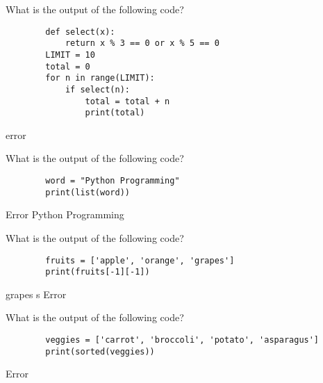 \documentclass{exam}
\begin{document}
\begin{questions}
   \question What is the output of the following code?

    \begin{verbatim}
        def select(x):
            return x % 3 == 0 or x % 5 == 0
        LIMIT = 10
        total = 0
        for n in range(LIMIT):
            if select(n):
                total = total + n
                print(total)
    \end{verbatim}
    \begin{oneparchoices}
        \choice error
    \end{oneparchoices}

   \question What is the output of the following code?

    \begin{verbatim}
        word = "Python Programming"
        print(list(word))
    \end{verbatim}
    \begin{oneparchoices}
        \choice Error
        \choice Python Programming
        \choice ['P', 'y', 't', 'h', 'o', 'n', ' ', 'P', 'r', 'o', 'g', 'r', 'a', 'm', 'm', 'i', 'n', 'g']
    \end{oneparchoices}

   \question What is the output of the following code?

    \begin{verbatim}
        fruits = ['apple', 'orange', 'grapes']
        print(fruits[-1][-1])
    \end{verbatim}
    \begin{oneparchoices}
        \choice grapes
        \choice s
        \choice Error
    \end{oneparchoices}

   \question What is the output of the following code?

    \begin{verbatim}
        veggies = ['carrot', 'broccoli', 'potato', 'asparagus']
        print(sorted(veggies))

    \end{verbatim}
    \begin{oneparchoices}
        \choice ['asparagus']
        \choice Error
    \end{oneparchoices}

\end{questions}
\end{document}
